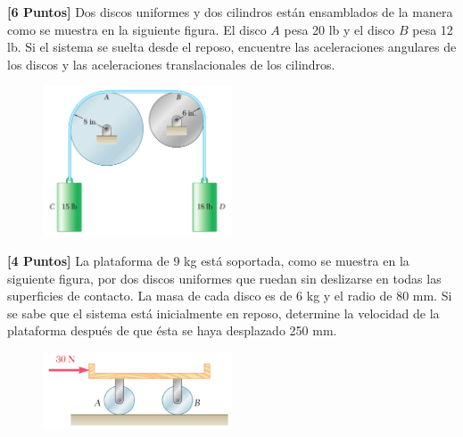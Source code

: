 \documentclass[ a4paper, twoside, 11pt]{article}
\begin{document}
\begin{problem}
\textbf{[6 Puntos]} Dos discos uniformes y dos cilindros est\'an ensamblados de la manera como se muestra en la siguiente figura. El disco $A$ pesa 20 lb y el disco $B$ pesa 12 lb. Si el sistema se suelta desde el reposo, encuentre las aceleraciones angulares de los discos y las aceleraciones translacionales de los cilindros. 

\begin{figure}[htb]
\centering
\includegraphics[width=0.50\textwidth]{problema-02.jpg}
\end{figure}

\end{problem}
\fullskip

\begin{problem}
\textbf{[4 Puntos]} La plataforma de 9 kg est\'a soportada, como se muestra en la siguiente figura, por dos discos uniformes que ruedan sin deslizarse en todas las superficies de contacto. La masa de cada disco es de 6 kg y el radio de 80 mm. Si se sabe que el sistema est\'a inicialmente en reposo, determine la velocidad de la plataforma despu\'es de que \'esta se haya desplazado 250 mm. 

\begin{figure}[htb]
\centering
\includegraphics[width=0.5\textwidth]{problema-03.jpg}
\end{figure}

\end{problem}
\fullskip
\end{document}
